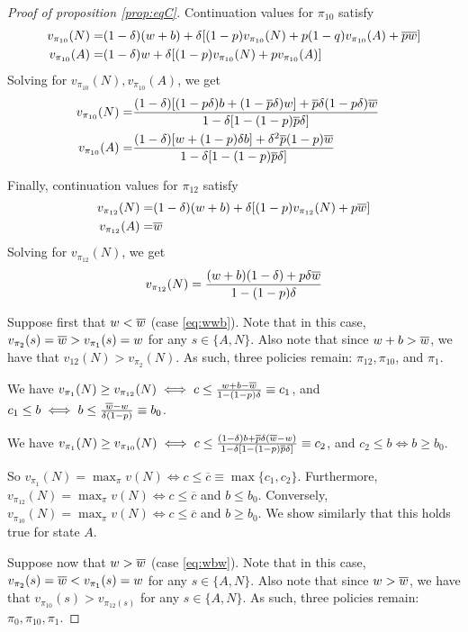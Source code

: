 {\begin{proof}[Proof of proposition \ref{prop:eqC}]
    Continuation values for $\pi_{10}$ satisfy
    \begin{align*}
        v_{\pi_{10}}(N) =& (1-\delta) (w+b) + \delta [(1-p) v_{\pi_{10}}(N) + p (1-q) v_{\pi_{10}}(A) + \overline{p} \overline{w}] \\ 
        v_{\pi_{10}}(A) =& (1-\delta) w + \delta [(1-p) v_{\pi_{10}}(N) + p v_{\pi_{10}}(A)]
    \end{align*}
    Solving for $v_{\pi_{10}}(N), v_{\pi_{10}}(A)$, we get
    \begin{align*}
        v_{\pi_{10}}(N) =& \frac{(1-\delta)[(1-p\delta)b+(1-\overline{p}\delta)w]+\overline{p}\delta(1-p\delta)\overline{w}}{1-\delta[1-(1-p)\overline{p}\delta]}\\
        v_{\pi_{10}}(A) =& \frac{(1-\delta)[w+(1-p)\delta b]+\delta^2\overline{p}(1-p)\overline{w}}{1-\delta[1-(1-p)\overline{p}\delta]}&
    \end{align*}

    Finally, continuation values for $\pi_{12}$ satisfy
    \begin{align*}
        v_{\pi_{12}}(N) =& (1-\delta) (w+b) + \delta [(1-p) v_{\pi_{12}}(N) + p\overline{w}] \\ 
        v_{\pi_{12}}(A) =& \overline{w}
    \end{align*}
    Solving for $v_{\pi_{12}}(N)$, we get
    $$
    v_{\pi_{12}}(N) = \frac{(w+b)(1-\delta)+p\delta\overline{w}}{1-(1-p)\delta}
    $$

    Suppose first that $w < \overline{w}$ (case \ref{eq:wwb}). Note that in this case, $v_{\pi_2}(s) = \overline{w} > v_{\pi_1}(s) = w$ for any $s \in \{A,N\}$. Also note that since $w+b > \overline{w}$, we have that $v_{12}(N) > v_{\pi_2}(N)$. As such, three policies remain: $\pi_{12}, \pi_{10}$, and $\pi_1$. 

    We have $v_{\pi_1}(N) \geq v_{\pi_{12}}(N) \iff c \leq \frac{w+b-\overline{w}}{1-(1-p)\delta} \equiv c_1$, and $c_1 \leq b \iff b \leq \frac{\overline{w}-w}{\delta(1-p)} \equiv b_0$. 

    We have $v_{\pi_1}(N) \geq v_{\pi_{10}}(N) \iff c \leq \frac{(1-\delta)b+\overline{p}\delta(\overline{w}-w)}{1-\delta[1-(1-p)\overline{p}\delta]} \equiv c_2$, and $c_2 \leq b \iff b \geq b_0$. 

    So $v_{\pi_1}(N) = \max_{\pi} v(N) \iff c \leq \overline{c} \equiv \max\{c_1, c_2\}$. Furthermore, $v_{\pi_{12}}(N) = \max_{\pi} v(N) \iff c \leq \overline{c}$ and $b \leq b_0$. Conversely, $v_{\pi_{10}}(N) = \max_{\pi} v(N) \iff c \leq \overline{c}$ and $b \geq b_0$. We show similarly that this holds true for state $A$. 

    Suppose now that $w > \overline{w}$ (case \ref{eq:wbw}). Note that in this case, $v_{\pi_2}(s) = \overline{w} < v_{\pi_1}(s) = w$ for any $s \in \{A,N\}$. Also note that since $w > \overline{w}$, we have that $v_{\pi_{10}}(s) > v_{\pi_{12}(s)}$ for any $s \in \{A,N\}$. As such, three policies remain: $\pi_0, \pi_{10}, \pi_1$. 


\end{proof}}
